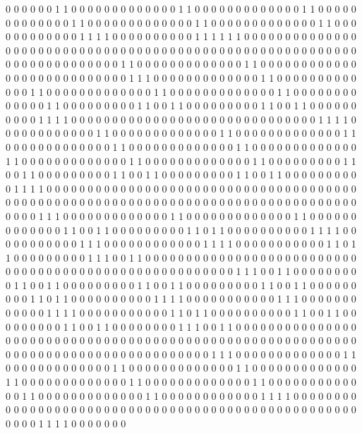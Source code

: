 0 0 0 0 0 0 1 1 0 0 0 0 0 0 0
0 0 0 0 0 0 1 1 0 0 0 0 0 0 0
0 0 0 0 0 0 1 1 0 0 0 0 0 0 0
0 0 0 0 0 0 1 1 0 0 0 0 0 0 0
0 0 0 0 0 0 1 1 0 0 0 0 0 0 0
0 0 0 0 0 0 1 1 0 0 0 0 0 0 0
0 0 0 0 0 1 1 1 1 0 0 0 0 0 0
0 0 0 0 1 1 1 1 1 1 0 0 0 0 0
0 0 0 0 0 0 0 0 0 0 0 0 0 0 0
0 0 0 0 0 0 0 0 0 0 0 0 0 0 0
0 0 0 0 0 0 0 0 0 0 0 0 0 0 0
0 0 0 0 0 0 0 0 0 0 0 0 0 0 0
0 0 0 0 0 0 1 1 0 0 0 0 0 0 0
0 0 0 0 0 0 1 1 0 0 0 0 0 0 0
0 0 0 0 0 0 0 0 0 0 0 0 0 0 0
0 0 0 0 0 1 1 1 0 0 0 0 0 0 0
0 0 0 0 0 0 1 1 0 0 0 0 0 0 0
0 0 0 0 0 0 1 1 0 0 0 0 0 0 0
0 0 0 0 0 0 1 1 0 0 0 0 0 0 0
0 0 0 0 0 0 1 1 0 0 0 0 0 0 0
0 0 0 0 0 0 1 1 0 0 0 0 0 0 0
0 0 1 1 0 0 1 1 0 0 0 0 0 0 0
0 0 1 1 0 0 1 1 0 0 0 0 0 0 0
0 0 0 1 1 1 1 0 0 0 0 0 0 0 0
0 0 0 0 0 0 0 0 0 0 0 0 0 0 0
0 0 0 0 0 0 0 1 1 1 1 0 0 0 0
0 0 0 0 0 0 0 0 1 1 0 0 0 0 0
0 0 0 0 0 0 0 0 1 1 0 0 0 0 0
0 0 0 0 0 0 0 0 1 1 0 0 0 0 0
0 0 0 0 0 0 0 0 1 1 0 0 0 0 0
0 0 0 0 0 0 0 0 1 1 0 0 0 0 0
0 0 0 0 0 0 0 0 1 1 0 0 0 0 0
0 0 0 0 0 0 0 0 1 1 0 0 0 0 0
0 0 0 0 0 0 0 0 1 1 0 0 0 0 0
0 0 0 0 1 1 0 0 1 1 0 0 0 0 0
0 0 0 0 1 1 0 0 1 1 0 0 0 0 0
0 0 0 0 1 1 0 0 1 1 0 0 0 0 0
0 0 0 0 0 1 1 1 1 0 0 0 0 0 0
0 0 0 0 0 0 0 0 0 0 0 0 0 0 0
0 0 0 0 0 0 0 0 0 0 0 0 0 0 0
0 0 0 0 0 0 0 0 0 0 0 0 0 0 0
0 0 0 0 0 0 0 0 0 0 0 0 0 0 0
0 0 0 0 0 0 0 0 0 0 0 0 0 0 0
0 0 0 0 1 1 1 0 0 0 0 0 0 0 0
0 0 0 0 0 1 1 0 0 0 0 0 0 0 0
0 0 0 0 0 1 1 0 0 0 0 0 0 0 0
0 0 0 0 0 1 1 0 0 1 1 0 0 0 0
0 0 0 0 0 1 1 0 1 1 0 0 0 0 0
0 0 0 0 0 1 1 1 1 0 0 0 0 0 0
0 0 0 0 0 1 1 1 0 0 0 0 0 0 0
0 0 0 0 0 1 1 1 1 0 0 0 0 0 0
0 0 0 0 0 1 1 0 1 1 0 0 0 0 0
0 0 0 0 1 1 1 0 0 1 1 0 0 0 0
0 0 0 0 0 0 0 0 0 0 0 0 0 0 0
0 0 0 0 0 0 0 0 0 0 0 0 0 0 0
0 0 0 0 0 0 0 0 0 0 0 0 0 0 0
0 0 0 0 0 1 1 1 0 0 1 1 0 0 0
0 0 0 0 0 0 1 1 0 0 1 1 0 0 0
0 0 0 0 0 0 1 1 0 0 1 1 0 0 0
0 0 0 0 0 0 1 1 0 0 1 1 0 0 0
0 0 0 0 0 0 1 1 0 1 1 0 0 0 0
0 0 0 0 0 0 1 1 1 1 0 0 0 0 0
0 0 0 0 0 0 1 1 1 0 0 0 0 0 0
0 0 0 0 0 0 1 1 1 1 0 0 0 0 0
0 0 0 0 0 0 1 1 0 1 1 0 0 0 0
0 0 0 0 0 0 1 1 0 0 1 1 0 0 0
0 0 0 0 0 0 1 1 0 0 1 1 0 0 0
0 0 0 0 0 1 1 1 0 0 1 1 0 0 0
0 0 0 0 0 0 0 0 0 0 0 0 0 0 0
0 0 0 0 0 0 0 0 0 0 0 0 0 0 0
0 0 0 0 0 0 0 0 0 0 0 0 0 0 0
0 0 0 0 0 0 0 0 0 0 0 0 0 0 0
0 0 0 0 0 0 0 0 0 0 0 0 0 0 0
0 0 0 0 0 1 1 1 0 0 0 0 0 0 0
0 0 0 0 0 0 1 1 0 0 0 0 0 0 0
0 0 0 0 0 0 1 1 0 0 0 0 0 0 0
0 0 0 0 0 0 1 1 0 0 0 0 0 0 0
0 0 0 0 0 0 1 1 0 0 0 0 0 0 0
0 0 0 0 0 0 1 1 0 0 0 0 0 0 0
0 0 0 0 0 0 1 1 0 0 0 0 0 0 0
0 0 0 0 0 0 1 1 0 0 0 0 0 0 0
0 0 0 0 0 0 1 1 0 0 0 0 0 0 0
0 0 0 0 0 1 1 1 1 0 0 0 0 0 0
0 0 0 0 0 0 0 0 0 0 0 0 0 0 0
0 0 0 0 0 0 0 0 0 0 0 0 0 0 0
0 0 0 0 0 0 0 0 0 0 0 0 0 0 0
0 0 0 0 1 1 1 1 0 0 0 0 0 0 0
